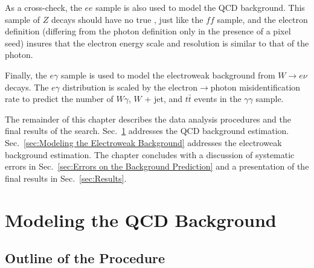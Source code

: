 \documentclass[dissertation.tex]{subfiles}
\begin{document}

As a cross-check, the $ee$ sample is also used to model the QCD background.  This sample of $Z$ decays should have no true \MET, just like the $\mathit{ff}$ sample, and the electron definition (differing from the photon definition only in the presence of a pixel seed) insures that the electron energy scale and resolution is similar to that of the photon.

Finally, the $e\gamma$ sample is used to model the electroweak background from $W\rightarrow e\nu$ decays.  The $e\gamma$ \MET distribution is scaled by the electron$\rightarrow$photon misidentification rate to predict the number of $W\gamma$, $W$ + jet, and $t\bar{t}$ events in the $\gamma\gamma$ sample.

The remainder of this chapter describes the data analysis procedures and the final results of the search.  Sec.~\ref{sec:Modeling the QCD Background} addresses the QCD background estimation.  Sec.~\ref{sec:Modeling the Electroweak Background} addresses the electroweak background estimation.  The chapter concludes with a discussion of systematic errors in Sec.~\ref{sec:Errors on the Background Prediction} and a presentation of the final results in Sec.~\ref{sec:Results}.

\section{Modeling the QCD Background}
\label{sec:Modeling the QCD Background}

\subsection{Outline of the Procedure}
\label{sec:Outline of the Procedure}
\end{document}
